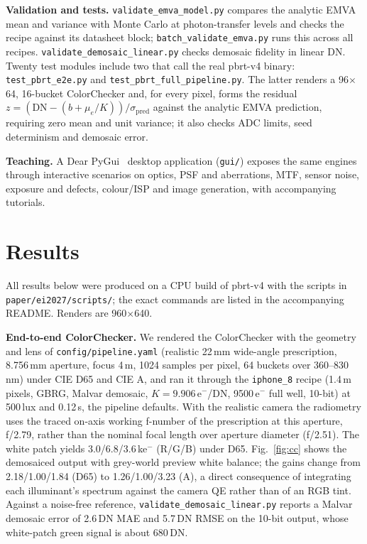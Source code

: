 \documentclass[letterpaper,twocolumn,fleqn]{article}
\begin{document}
\textbf{Validation and tests.} \texttt{validate\_emva\_model.py} compares the analytic EMVA mean and variance with Monte Carlo at photon-transfer levels and checks the recipe against its datasheet block; \texttt{batch\_validate\_emva.py} runs this across all recipes. \texttt{validate\_demosaic\_linear.py} checks demosaic fidelity in linear DN. Twenty test modules include two that call the real pbrt-v4 binary: \texttt{test\_pbrt\_e2e.py} and \texttt{test\_pbrt\_full\_pipeline.py}. The latter renders a 96$\times$64, 16-bucket ColorChecker and, for every pixel, forms the residual
$z = (\mathrm{DN}-(b+\mu_e/K))/\sigma_{\mathrm{pred}}$ against the analytic EMVA prediction, requiring zero mean and unit variance; it also checks ADC limits, seed determinism and demosaic error.

\textbf{Teaching.} A Dear PyGui~\cite{dearpygui} desktop application (\texttt{gui/}) exposes the same engines through interactive scenarios on optics, PSF and aberrations, MTF, sensor noise, exposure and defects, colour/ISP and image generation, with accompanying tutorials.

\section{Results}
All results below were produced on a CPU build of pbrt-v4 with the scripts in \texttt{paper/ei2027/scripts/}; the exact commands are listed in the accompanying README. Renders are 960$\times$640.

\textbf{End-to-end ColorChecker.} We rendered the ColorChecker with the geometry and lens of \texttt{config/pipeline.yaml} (realistic 22\,mm wide-angle prescription, 8.756\,mm aperture, focus 4\,m, 1024 samples per pixel, 64 buckets over 360--830\,nm) under CIE D65 and CIE A, and ran it through the \texttt{iphone\_8} recipe (1.4\,\textmu m pixels, GBRG, Malvar demosaic, $K=9.906$\,e$^-$/DN, 9500\,e$^-$ full well, 10-bit) at 500\,lux and 0.12\,s, the pipeline defaults. With the realistic camera the radiometry uses the traced on-axis working f-number of the prescription at this aperture, f/2.79, rather than the nominal focal length over aperture diameter (f/2.51). The white patch yields 3.0/6.8/3.6\,ke$^-$ (R/G/B) under D65. Fig.~\ref{fig:cc} shows the demosaiced output with grey-world preview white balance; the gains change from 2.18/1.00/1.84 (D65) to 1.26/1.00/3.23 (A), a direct consequence of integrating each illuminant's spectrum against the camera QE rather than of an RGB tint. Against a noise-free reference, \texttt{validate\_demosaic\_linear.py} reports a Malvar demosaic error of 2.6\,DN MAE and 5.7\,DN RMSE on the 10-bit output, whose white-patch green signal is about 680\,DN.
\end{document}
